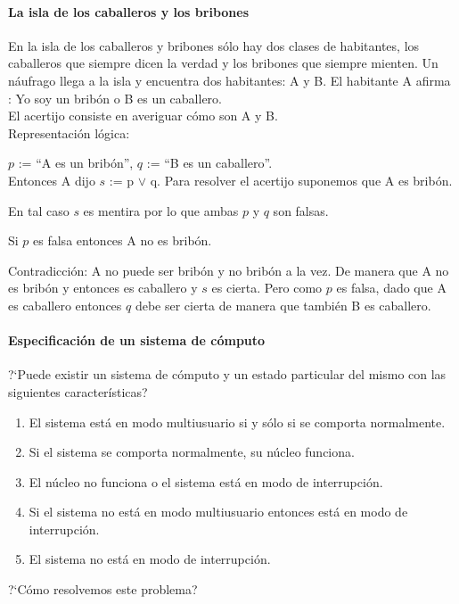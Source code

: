 \documentclass[11pt,letterpaper]{article}
\begin{document}
\paragraph{La isla de los caballeros y los bribones}

En la isla de los caballeros y bribones sólo hay dos clases de habitantes, 
los caballeros que siempre dicen la verdad y los bribones que siempre mienten. 
Un n\'aufrago llega a la isla y encuentra dos habitantes: A y B. 
El habitante A afirma : Yo soy un bribón o B es un caballero. \\
El acertijo consiste en averiguar c\'omo son A y B.\\

\noindent Representación l\'ogica: 
\bi
 \item[] $p$ := ``A es un bribón'', $q$ := ``B es un caballero''.\\
  Entonces A dijo $s$ := p $\lor$ q.
\ei
Para resolver el acertijo suponemos que A es bribón.
 \bi
  \item En tal caso $s$ es mentira por lo que ambas $p$ y $q$ son falsas.
  \item Si $p$ es falsa entonces A no es bribón.
  \item Contradicción: A no puede ser bribón y no bribón a la vez.
 \ei
 De manera que A no es bribón y entonces es caballero y $s$ es cierta. 
 Pero como $p$ es falsa, dado que A es caballero entonces $q$ debe ser cierta 
 de manera que también B es caballero.


\paragraph{Especificación de un sistema de cómputo}
?`Puede existir un sistema de cómputo y un estado particular del mismo con las 
siguientes características?
\begin{enumerate}
 \item El sistema está en modo multiusuario si y sólo si se comporta 
  normalmente.
 \item Si el sistema se comporta normalmente, su núcleo funciona.
 \item El núcleo no funciona o el sistema está en modo de interrupción.
 \item Si el sistema no está en modo multiusuario entonces está en modo de 
  interrupción.
 \item El sistema no está en modo de interrupción.
\end{enumerate}

?`Cómo resolvemos este problema? 
\end{document}
